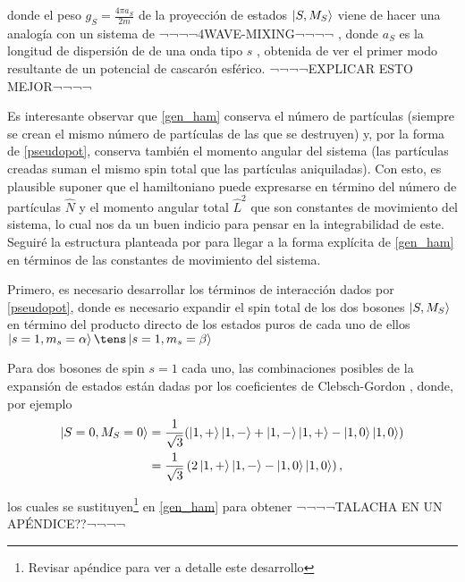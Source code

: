 donde el peso $g_S = \frac{4\pi a_S}{2m}$ de la proyección de estados $\left|S,M_S\right\rangle$ viene de hacer una analogía con un sistema de  ¬¬¬¬4WAVE-MIXING¬¬¬¬ \cite{g_smodel}, donde $a_S$ es la longitud de dispersión de de una onda tipo $s$ \cite{s-wave}, obtenida de ver el primer modo resultante de un potencial de cascarón esférico. ¬¬¬¬EXPLICAR ESTO MEJOR¬¬¬¬  
 

Es interesante observar que \ref{gen_ham} conserva el número de partículas (siempre se crean el mismo número de partículas de las que se destruyen) y, por la forma de \ref{pseudopot}, conserva también el momento angular del sistema (las partículas creadas suman el mismo spin total que las partículas aniquiladas).
Con esto, es plausible suponer que el hamiltoniano puede expresarse en término del número de partículas $\hat{N}$ y el momento angular total $\hat{L}^2$ que son constantes de movimiento del sistema, lo cual nos da un buen indicio para pensar en la integrabilidad de este. Seguiré la estructura planteada por \cite{law98} para llegar a la forma explícita de \ref{gen_ham} en términos de las constantes de movimiento del sistema. 

Primero, es necesario desarrollar los términos de interacción dados por \ref{pseudopot}, donde es necesario expandir el spin total de los dos bosones $\left|S,M_S\right\rangle$ en término del producto directo de los estados puros de cada uno de ellos $\ket{s=1,m_s=\alpha} \tens \ket{s=1,m_s=\beta}$

Para dos bosones de spin $s=1$ cada uno, las combinaciones posibles de la expansión de estados están dadas por los coeficientes de Clebsch-Gordon \cite{griffiths}, donde, por ejemplo
\begin{equation*}
\begin{split}
\left|S=0,M_S=0\right\rangle = \frac{1}{\sqrt{3}} &  ( \left|1,+\right\rangle\left|1,-\right\rangle + \left|1,-\right\rangle\left|1,+\right\rangle - \left|1,0\right\rangle\left|1,0\right\rangle ) \\ 
 = \frac{1}{\sqrt{3}} & \left( 2\left|1,+\right\rangle\left|1,-\right\rangle - \left|1,0\right\rangle\left|1,0\right\rangle \right),
\end{split}
\end{equation*}

los cuales se sustituyen\footnote{Revisar apéndice \cite{talacha} para ver a detalle este desarrollo} en \ref{gen_ham} para obtener ¬¬¬¬TALACHA EN UN APÉNDICE??¬¬¬¬

